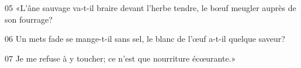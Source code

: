 
05 «L’âne sauvage va-t-il braire devant l’herbe tendre, le bœuf meugler auprès de son fourrage?

06 Un mets fade se mange-t-il sans sel, le blanc de l’œuf a-t-il quelque saveur?

07 Je me refuse à y toucher; ce n’est que nourriture écœurante.»
